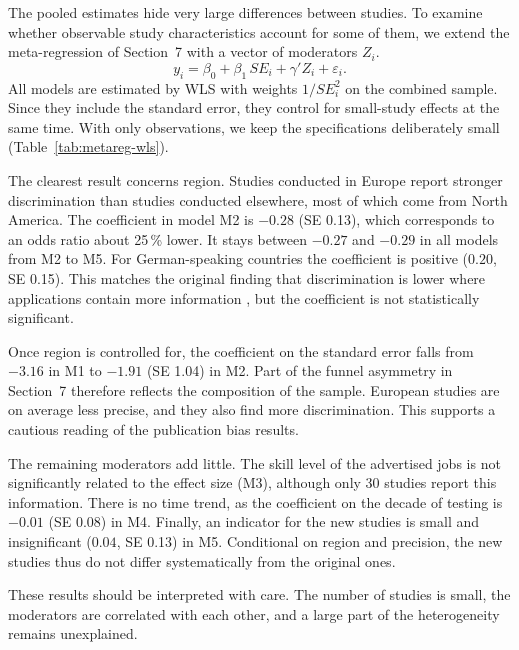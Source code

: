 \documentclass[11pt,a4paper]{article}
\begin{document}
The pooled estimates hide very large differences between studies. To
examine whether observable study characteristics account for some of them,
we extend the meta-regression of Section~7 with a vector of moderators
$Z_i$.
\begin{equation}
  y_i = \beta_0 + \beta_1\, SE_i + \gamma' Z_i + \varepsilon_i .
\end{equation}
All models are estimated by WLS with weights $1/SE_i^2$ on the combined
sample. Since they include the standard error, they control for small-study
effects at the same time. With only \maKcomb{} observations, we keep the
specifications deliberately small (Table~\ref{tab:metareg-wls}).



The clearest result concerns region. Studies conducted in Europe report
stronger discrimination than studies conducted elsewhere, most of which
come from North America. The coefficient in model M2 is $-0.28$ (SE 0.13),
which corresponds to an odds ratio about 25\,\% lower. It stays between
$-0.27$ and $-0.29$ in all models from M2 to M5. For German-speaking
countries the coefficient is positive ($0.20$, SE 0.15). This matches the
original finding that discrimination is lower where applications contain
more information \citep{zschirnt2016}, but the coefficient is not
statistically significant.

Once region is controlled for, the coefficient on the standard error falls
from $-3.16$ in M1 to $-1.91$ (SE 1.04) in M2. Part of the funnel asymmetry
in Section~7 therefore reflects the composition of the sample. European
studies are on average less precise, and they also find more
discrimination. This supports a cautious reading of the publication bias
results.

The remaining moderators add little. The skill level of the advertised jobs
is not significantly related to the effect size (M3), although only 30
studies report this information. There is no time trend, as the
coefficient on the decade of testing is $-0.01$ (SE 0.08) in M4. Finally,
an indicator for the \maKnew{} new studies is small and insignificant
($0.04$, SE 0.13) in M5. Conditional on region and precision, the new
studies thus do not differ systematically from the original ones.

These results should be interpreted with care. The number of studies is
small, the moderators are correlated with each other, and a large part of
the heterogeneity remains unexplained.
\end{document}
